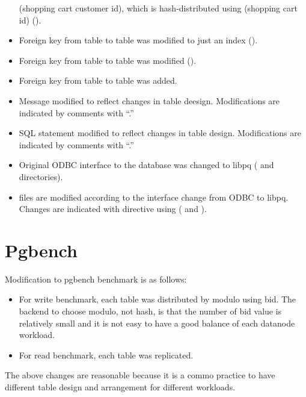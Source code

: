 \begin{itemize}
		(shopping cart customer id), which is hash-distributed using 
		(shopping cart id) ().
  	\item Foreign key from  table to  table was modified to just
			an index ().
  	\item Foreign key from  table to  table was modified
  		().
  	\item Foreign key from  table to  table was added.
  	\item Message modified to reflect changes in table deesign.
  		Modifications are indicated by comments with ``.''
  	\item SQL statement modified to reflect changes in table design.
  		Modifications are indicated by comments with ``.''
  	\item Original ODBC interface to the database was changed to libpq
		( and  directories).
  	\item {} files are modified according to the interface change from ODBC to libpq.
   		Changes are indicated with  directive using  ( and ).
  \end{itemize}


\section{\label{sec:pgbench}Pgbench}

  Modification to pgbench benchmark is as follows:
  
  \begin{itemize}
	  \item For write benchmark, each table was distributed by modulo using bid.
	  		The backend to choose modulo, not hash, is that the number of bid value is relatively
			small and it is not easy to have a good balance of each datanode workload.
	  \item For read benchmark, each table was replicated.
  \end{itemize}

  The above changes are reasonable because it is a commo practice to have different
  table design and arrangement for different workloads.

